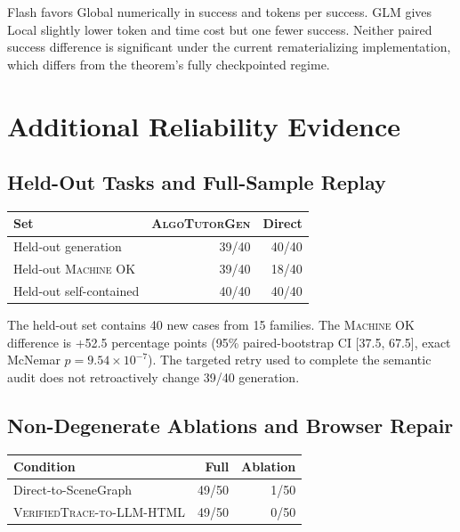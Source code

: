 \documentclass[letterpaper]{article}
\newcommand{\system}{\textsc{AlgoTutorGen}}
\newcommand{\machineok}{\textsc{Machine OK}}
\newcommand{\vtllm}{\textsc{VerifiedTrace-to-LLM-HTML}}
\newenvironment{coltable}
  {\begin{center}\begin{minipage}{\columnwidth}\centering}
  {\end{minipage}\end{center}}
\begin{document}
Flash favors Global numerically in success and tokens per success. GLM gives Local slightly lower token and time cost but one fewer success. Neither paired success difference is significant under the current rematerializing implementation, which differs from the theorem's fully checkpointed regime.

\section{Additional Reliability Evidence}

\subsection{Held-Out Tasks and Full-Sample Replay}

\begin{coltable}
\small
\begin{tabular}{@{}lrr@{}}
\toprule
Set & \system{} & Direct \\
\midrule
Held-out generation & 39/40 & 40/40 \\
Held-out \machineok{} & 39/40 & 18/40 \\
Held-out self-contained & 40/40 & 40/40 \\
\bottomrule
\end{tabular}
\label{tab:additional-robustness}
\end{coltable}

The held-out set contains 40 new cases from 15 families. The \machineok{} difference is +52.5 percentage points (95\% paired-bootstrap CI [37.5, 67.5], exact McNemar $p=9.54\times10^{-7}$). The targeted retry used to complete the semantic audit does not retroactively change 39/40 generation.

\subsection{Non-Degenerate Ablations and Browser Repair}

\begin{coltable}
\small
\begin{tabular*}{\columnwidth}{@{\extracolsep{\fill}}lrr@{}}
\toprule
Condition & Full & Ablation \\
\midrule
Direct-to-SceneGraph & 49/50 & 1/50 \\
\vtllm{} & 49/50 & 0/50 \\
\bottomrule
\end{tabular*}
\label{tab:ablations}
\end{coltable}
\end{document}
